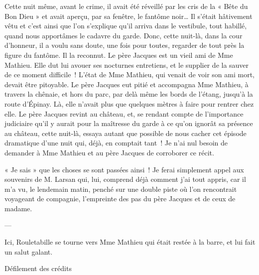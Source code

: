 \documentclass{frscenario}
\begin{document}
\coupe

Cette nuit même, avant le crime, il avait été réveillé par les cris de la « Bête du Bon Dieu » et avait aperçu, par sa fenêtre, le fantôme noir… Il s’était hâtivement vêtu et c’est ainsi que l’on s’explique qu’il arriva dans le vestibule, tout habillé, quand nous apportâmes le cadavre du garde. Donc, cette nuit-là, dans la cour d’honneur, il a voulu sans doute, une fois pour toutes, regarder de tout près la figure du fantôme. Il la reconnut. Le père Jacques est un vieil ami de Mme Mathieu. Elle dut lui avouer ses nocturnes entretiens, et le supplier de la sauver de ce moment difficile ! L’état de Mme Mathieu, qui venait de voir son ami mort, devait être pitoyable. Le père Jacques eut pitié et accompagna Mme Mathieu, à travers la chênaie, et hors du parc, par delà même les bords de l’étang, jusqu’à la route d’Épinay. Là, elle n’avait plus que quelques mètres à faire pour rentrer chez elle. Le père Jacques revint au château, et, se rendant compte de l’importance judiciaire qu’il y aurait pour la maîtresse du garde à ce qu’on ignorât sa présence au château, cette nuit-là, essaya autant que possible de nous cacher cet épisode dramatique d’une nuit qui, déjà, en comptait tant ! Je n’ai nul besoin de demander à Mme Mathieu et au père Jacques de corroborer ce récit.

« Je sais » que les choses se sont passées ainsi ! Je ferai simplement appel aux souvenirs de M. Larsan qui, lui, comprend déjà comment j’ai tout appris, car il m’a vu, le lendemain matin, penché sur une double piste où l’on rencontrait voyageant de compagnie, l’empreinte des pas du père Jacques et de ceux de madame.

\——

Ici, Rouletabille se tourne vers Mme Mathieu qui était restée à la barre, et lui fait un salut galant.


\Generique

Défilement des crédits
\end{document}

